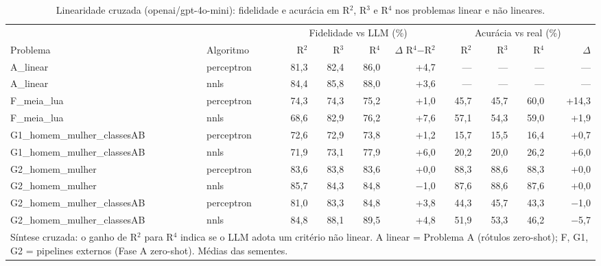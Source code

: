 \begin{table}[htbp]
\centering
\small
\caption{Linearidade cruzada (openai/gpt-4o-mini): fidelidade e acurácia em R$^2$, R$^3$ e R$^4$ nos problemas linear e não lineares.}
\label{tab:final_linearidade_cruzada_R2_R3_R4_gpt4mini}
\begin{tabular}{llrrrrrrrr}
\toprule
 &  & \multicolumn{4}{c}{Fidelidade vs LLM (\%)} & \multicolumn{4}{c}{Acurácia vs real (\%)} \\ \cmidrule(lr){3-6} \cmidrule(lr){7-10}
Problema & Algoritmo & R$^2$ & R$^3$ & R$^4$ & $\Delta$ R$^4$$-$R$^2$ & R$^2$ & R$^3$ & R$^4$ & $\Delta$ \\
\midrule
A\_linear & perceptron & 81,3 & 82,4 & 86,0 & +4,7 & — & — & — & — \\
A\_linear & nnls & 84,4 & 85,8 & 88,0 & +3,6 & — & — & — & — \\
\midrule
F\_meia\_lua & perceptron & 74,3 & 74,3 & 75,2 & +1,0 & 45,7 & 45,7 & 60,0 & +14,3 \\
F\_meia\_lua & nnls & 68,6 & 82,9 & 76,2 & +7,6 & 57,1 & 54,3 & 59,0 & +1,9 \\
\midrule
G1\_homem\_mulher\_classesAB & perceptron & 72,6 & 72,9 & 73,8 & +1,2 & 15,7 & 15,5 & 16,4 & +0,7 \\
G1\_homem\_mulher\_classesAB & nnls & 71,9 & 73,1 & 77,9 & +6,0 & 20,2 & 20,0 & 26,2 & +6,0 \\
\midrule
G2\_homem\_mulher & perceptron & 83,6 & 83,8 & 83,6 & +0,0 & 88,3 & 88,6 & 88,3 & +0,0 \\
G2\_homem\_mulher & nnls & 85,7 & 84,3 & 84,8 & $-$1,0 & 87,6 & 88,6 & 87,6 & +0,0 \\
\midrule
G2\_homem\_mulher\_classesAB & perceptron & 81,0 & 83,3 & 84,8 & +3,8 & 44,3 & 45,7 & 43,3 & $-$1,0 \\
G2\_homem\_mulher\_classesAB & nnls & 84,8 & 88,1 & 89,5 & +4,8 & 51,9 & 53,3 & 46,2 & $-$5,7 \\
\bottomrule
\multicolumn{10}{p{0.95\linewidth}}{\footnotesize Síntese cruzada: o ganho de R$^2$ para R$^4$ indica se o LLM adota um critério não linear. A linear = Problema A (rótulos zero-shot); F, G1, G2 = pipelines externos (Fase A zero-shot). Médias das sementes.} \\
\end{tabular}
\end{table}
